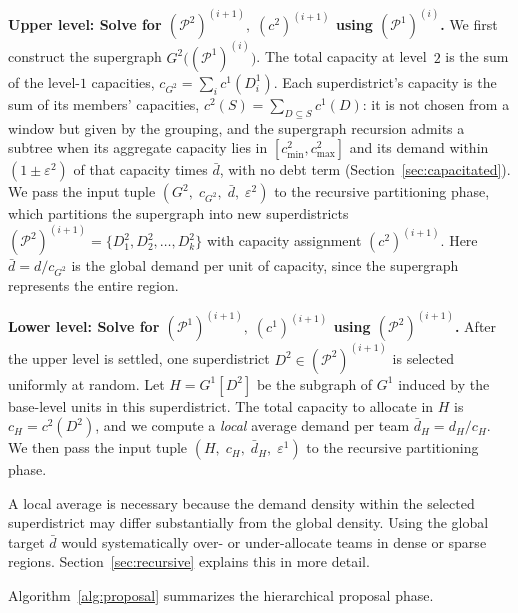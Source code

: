 \documentclass[11pt]{article}
\theoremstyle{definition}
\begin{document}
\medskip
\noindent\textbf{Upper level: Solve for $(\mathcal{P}^2)^{(i+1)},\;
(c^2)^{(i+1)}$ using $(\mathcal{P}^1)^{(i)}$.}\quad
We first construct the supergraph $G^2\bigl((\mathcal{P}^1)^{(i)}\bigr)$.
The total capacity at level~$2$ is the sum of the level-$1$ capacities,
$c_{G^2} = \sum_i c^1(D_i^1)$. Each superdistrict's capacity is the sum of its members' capacities, $c^2(S) = \sum_{D \subseteq S} c^1(D)$: it is not chosen from a window but given by the grouping, and the supergraph recursion admits a subtree when its aggregate capacity lies in $[c^2_{\min}, c^2_{\max}]$ and its demand within $(1 \pm \varepsilon^2)$ of that capacity times $\bar d$, with no debt term (Section~\ref{sec:capacitated}).  We pass the
input tuple $(G^2,\; c_{G^2},\; \bar{d},\; \varepsilon^2)$ to the recursive
partitioning phase, which partitions the supergraph into new superdistricts
$(\mathcal{P}^2)^{(i+1)} = \{D_1^2, D_2^2, \ldots, D_k^2\}$ with capacity
assignment $(c^2)^{(i+1)}$.  Here $\bar{d} = d/c_{G^2}$ is the global demand per unit of capacity, since the supergraph represents the entire region.

\medskip
\noindent\textbf{Lower level: Solve for $(\mathcal{P}^1)^{(i+1)},\;
(c^1)^{(i+1)}$ using $(\mathcal{P}^2)^{(i+1)}$.}\quad
After the upper level is settled, one superdistrict
$D^2 \in (\mathcal{P}^2)^{(i+1)}$ is selected uniformly at random.  Let
$H = G^1[D^2]$ be the subgraph of $G^1$ induced by the base-level units in
this superdistrict.  The total capacity to allocate in $H$ is
$c_H = c^2(D^2)$, and we compute a \emph{local} average demand per team
$\bar{d}_H = d_H / c_H$.  We then pass the input tuple
$(H,\; c_H,\; \bar{d}_H,\; \varepsilon^1)$ to the recursive partitioning
phase.

A local average is necessary because the demand density within the selected superdistrict may differ substantially from the global density. Using the global target $\bar{d}$ would systematically over- or under-allocate teams in dense or sparse regions. Section~\ref{sec:recursive} explains this in more detail.

Algorithm~\ref{alg:proposal} summarizes the hierarchical proposal phase.

\medskip
\medskip
\end{document}
